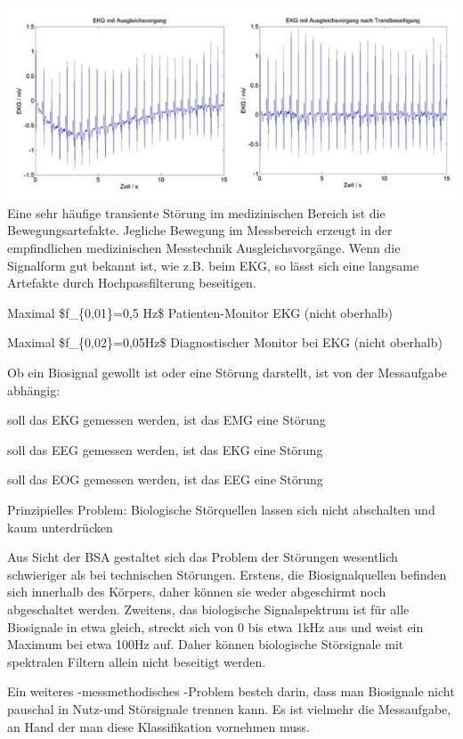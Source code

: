 \documentclass[a4paper]{article}
\begin{document}
\begin{multicols}{3}
  \includegraphics[width=.5\linewidth]{Assets/Biosignalverarbeitung-trendelimination.png} Eine
  sehr häufige transiente Störung im medizinischen Bereich ist die
  Bewegungsartefakte. Jegliche Bewegung im Messbereich erzeugt in der
  empfindlichen medizinischen Messtechnik Ausgleichsvorgänge. Wenn die
  Signalform gut bekannt ist, wie z.B. beim EKG, so lässt sich eine
  langsame Artefakte durch Hochpassfilterung beseitigen.

  \begin{itemize*}
    \item Maximal \$f\_\{0,01\}=0,5 Hz\$ Patienten-Monitor EKG (nicht oberhalb)
    \item Maximal \$f\_\{0,02\}=0,05Hz\$ Diagnostischer Monitor bei EKG (nicht oberhalb)
  \end{itemize*}

  Ob ein Biosignal gewollt ist oder eine Störung darstellt, ist von der
  Messaufgabe abhängig:

  \begin{itemize*}
    \item soll das EKG gemessen werden, ist das EMG eine Störung
    \item soll das EEG gemessen werden, ist das EKG eine Störung
    \item soll das EOG gemessen werden, ist das EEG eine Störung
  \end{itemize*}

  Prinzipielles Problem: Biologische Störquellen lassen sich nicht
  abschalten und kaum unterdrücken

  Aus Sicht der BSA gestaltet sich das Problem der Störungen wesentlich
  schwieriger als bei technischen Störungen. Erstens, die Biosignalquellen
  befinden sich innerhalb des Körpers, daher können sie weder abgeschirmt
  noch abgeschaltet werden. Zweitens, das biologische Signalspektrum ist
  für alle Biosignale in etwa gleich, streckt sich von 0 bis etwa 1kHz aus
  und weist ein Maximum bei etwa 100Hz auf. Daher können biologische
  Störsignale mit spektralen Filtern allein nicht beseitigt werden.

  Ein weiteres -messmethodisches -Problem besteh darin, dass man
  Biosignale nicht pauschal in Nutz-und Störsignale trennen kann. Es ist
  vielmehr die Messaufgabe, an Hand der man diese Klassifikation vornehmen
  muss.


\end{multicols}
\end{document}
